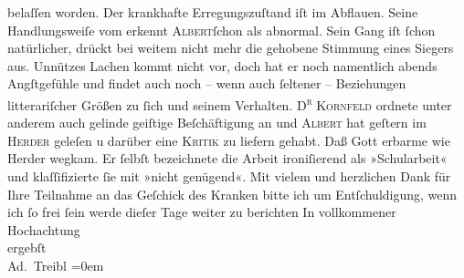 \begin{ledgroupsized}[t]{13cm}
                    belaſſen worden. Der krankhafte Erregungszuſtand iſt im Abflauen. Seine
                    Handlungsweiſe vom \label{K_L01575_1v}\label{K_L01575_1h} erkennt \textsc{Albert}ſchon als abnormal. Sein Gang iſt ſchon
                    natürlicher, drückt bei weitem nicht mehr die gehobene Stimmung eines Siegers
                    aus. Unnützes {\pb}Lachen kommt nicht vor, doch hat
                    er noch namentlich abends Angſtgefühle und findet auch noch – wenn auch ſeltener
                    – Beziehungen litterariſcher Größen zu ſich und seinem Verhalten.\pend
           \pstart
           \textsc{D\textsuperscript{r}}{ }\textsc{Kornfeld} ordnete unter anderem auch gelinde geiſtige Beſchäftigung an und \textsc{Albert} hat geſtern im \textsc{Herder} geleſen u darüber eine \textsc{Kritik} zu liefern gehabt.
                    Daß Gott erbarme wie Herder wegkam. Er ſelbſt
                        be{\pb}zeichnete die Arbeit ironiſierend als
                    »Schularbeit« und klaſſifizierte ſie mit »nicht genügend«.\pend
           \pstart
           Mit vielem und herzlichen Dank für Ihre Teilnahme an das Geſchick des Kranken bitte ich um
                    Entſchuldigung, wenn ich ſo frei ſein werde dieſer Tage weiter zu berichten \pend
           \pstart
           In vollkommener Hochachtung{\\[\baselineskip]}ergebſt{\\[\baselineskip]}\spacefill\mbox{Ad. Treibl}\pend
           \leftskip=0em{}
         
         \endnumbering{}\end{ledgroupsized}  \newcommand{\dateiname}{L01575}\newcommand{\titel}{Adolf Treibl an Arthur Schnitzler, [22.? 1. 1906]}\newcommand{\editorInnen}{Martin Anton Müller und Gerd-Hermann Susen}
      